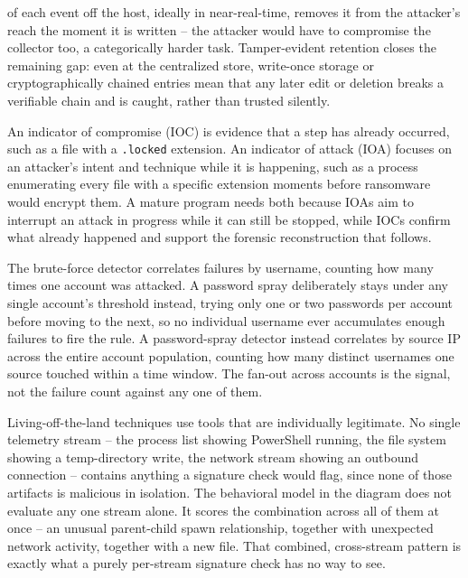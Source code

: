 \begin{answerkey}
of each event off the host, ideally in near-real-time, removes it from the attacker's reach the
moment it is written -- the attacker would have to compromise the collector too, a categorically
harder task. Tamper-evident retention closes the remaining gap: even at the centralized store,
write-once storage or cryptographically chained entries mean that any later edit or deletion breaks
a verifiable chain and is caught, rather than trusted silently.
\item An indicator of compromise (IOC) is evidence that a step has already occurred, such as a file
with a \texttt{.locked} extension. An indicator of attack (IOA) focuses on an attacker's intent and
technique while it is happening, such as a process enumerating every file with a specific extension
moments before ransomware would encrypt them. A mature program needs both because IOAs aim to
interrupt an attack in progress while it can still be stopped, while IOCs confirm what already
happened and support the forensic reconstruction that follows.
\item The brute-force detector correlates failures by username, counting how many times one
account was attacked. A password spray deliberately stays under any single account's threshold
instead, trying only one or two passwords per account before moving to the next, so no individual
username ever accumulates enough failures to fire the rule. A password-spray detector instead
correlates by source IP across the entire account population, counting how many distinct usernames
one source touched within a time window. The fan-out across accounts is the signal, not the failure
count against any one of them.
\item Living-off-the-land techniques use tools that are individually legitimate. No single
telemetry stream -- the process list showing PowerShell running, the file system showing a
temp-directory write, the network stream showing an outbound connection -- contains anything a
signature check would flag, since none of those artifacts is malicious in isolation. The
behavioral model in the diagram does not evaluate any one stream alone. It scores the combination
across all of them at once -- an unusual parent-child spawn relationship, together with unexpected
network activity, together with a new file. That combined, cross-stream pattern is exactly what a
purely per-stream signature check has no way to see.
\end{answerkey}

